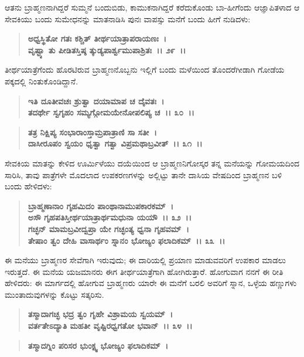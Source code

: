 ಆತನು ಬ್ರಾಹ್ಮಣನಾಗಿದ್ದರೆ ಸುಮ್ಮನೆ ಬಂದುಬಿಡು, ಕಾಮುಕನಾಗಿದ್ದರೆ ಕರೆದುಕೊಂಡು ಬಾ-ಹೀಗೆಂದು ಆಜ್ಞಾಪಿತಳಾದ ಆ ಸೇವಕಿಯು ಬಂದು ಸುಮೇಧನನ್ನು ಮಾತನಾಡಿಸಿ ಪುನಃ ವಾಪಸ್ಸು ಮನೆಗೆ ಬಂದು ಹೀಗೆ ನುಡಿದಳು:

\begin{verse}
\textbf{ಅಧ್ವಸ್ಥಿತೋ ಗತಃ ಕಶ್ಚಿತ್ ತೀರ್ಥಯಾತ್ರಾಪರಾಯಣಃ~।}\\\textbf{ವೃಷ್ಟ್ಯಾ ತು ಪೀಡಿತಸ್ತಿಷ್ಠ ತ್ಕುಡ್ಯಪಾರ್ಶ್ವಮುಪಾಶ್ರಿತಃ~।। ೨೯~।।}
\end{verse}

ತೀರ್ಥಯಾತ್ರೆಗೆಂದು ಹೊರಟಿರುವ ಬ್ರಾಹ್ಮಣನೊಬ್ಬನು ಇಲ್ಲಿಗೆ ಬಂದು ಮಳೆಯಿಂದ ತೊಂದರೆಗೀಡಾಗಿ ಗೋಡೆಯ ಪಕ್ಕದಲ್ಲಿ ನಿಂತುಕೊಂಡಿದ್ದಾನೆ.

\begin{verse}
\textbf{ಇತಿ ದೂತೀವಚಃ ಶ್ರುತ್ವಾ ದಯಾಮಾಪ ಚ ದೈವತಃ~।}\\\textbf{ತದರ್ಥೇ ಸ್ವಗೃಹಂ ಸಮ್ಯಗ್ಗೋಮಯೇನೋಪಲಿಪ್ಯ ಚ~।। ೩೦~।। }
\end{verse}

\begin{verse}
\textbf{ತತ್ರ ನಿಕ್ಷಿಪ್ಯ ಸಂಭಾರಾಂಸ್ತಾಮ್ರಪಾತ್ರಾಣಿ ಸಾ ಸತೀ~।}\\\textbf{ದಾಸೀರೂಪಂ ಸ್ವಯಂ ಧೃತ್ವಾ ಗತ್ವಾ ವಿಪ್ರಮಥಾಬ್ರವೀತ್~।। ೩೧~।।}
\end{verse}

ಸೇವಕಿಯ ಮಾತನ್ನು ಕೇಳಿದ ಊರ್ಮಿಳೆಯು ದಯೆಯಿಂದ ಆ ಬ್ರಾಹ್ಮಣನಿಗೋಸ್ಕರ ತನ್ನ ಮನೆಯನ್ನು ಗೋಮಯದಿಂದ ಸಾರಿಸಿ, ತಾವು ಪಾತ್ರೆಗಳೇ ಮೊದಲಾದ ಉಪಕರಣಗಳನ್ನು ಅಲ್ಲಿಟ್ಟು ತಾನೇ ದಾಸಿಯ ವೇಷದಿಂದ ಬ್ರಾಹ್ಮಣನ ಬಳಿ ಬಂದು ಹೇಳಿದಳು:

\begin{verse}
\textbf{ಬ್ರಾಹ್ಮಣಾನಾಂ ಗೃಹಮಿದಂ ಪಾಂಥಾನಾಮುಪಕಾರಕಮ್~।}\\\textbf{ಅಸೌ ಗೃಹಪತಿಸ್ತೀರ್ಥಯಾತ್ರಾರ್ಥಮಧುನಾ ಯಯೌ~।। ೩೨~।। }\\\textbf{ಗಚ್ಛನ್ ಮಾಮಬ್ರವೀದ್ವಪ್ರಾ ಯೇ ಗಚ್ಛಂತ್ಯ ಧ್ವನಾ ಗೃಹವಮ್~।} \\\textbf{ತೇಷಾಂ ತ್ವಂ ದೇಹಿ ವಾಸಾರ್ಥಂ ಸ್ನಾನಂ ಭೋಜ್ಯಂ ಫಲಾದಿಕಮ್~।। ೩೩~।।}
\end{verse}

ಈ ಮನೆಯು ಬ್ರಾಹ್ಮಣರ ಸೇವೆಗಾಗಿ ಇರುವುದು; ಈ ದಾರಿಯಲ್ಲಿ ಪ್ರಯಾಣ ಮಾಡುವವರಿಗೆ ಉಪಕಾರ ಮಾಡಲು ಇರುತ್ತದೆ. ಈ ಮನೆಯ ಯಜಮಾನರು ಈಗ ತೀರ್ಥಯಾತ್ರೆಗಾಗಿ ಹೋಗಿರುತ್ತಾರೆ. ಹೋಗುವಾಗ ನನಗೆ ಈ ರೀತಿ ಹೇಳಿದರು: ಈ ಮಾರ್ಗದಲ್ಲಿ ಹೋಗುವ ಬ್ರಾಹ್ಮಣರು ಯಾರೇ ಈ ಮನೆಗೆ ಬರಲಿ ಅವರಿಗೆ ಸ್ನಾನ, ಒಳ್ಳೆಯ ಹಣ್ಣುಗಳು ಮುಂತಾದುವುಗಳನ್ನು ಕೊಟ್ಟು ಸತ್ಕರಿಸು.

\begin{verse}
\textbf{ತಸ್ಮಾದಾಗಚ್ಛ ಭದ್ರ ತ್ವಂ ಗೃಹೇ ವಿಶ್ರಾಮಯ ಸ್ವಯಮ್~।}\\\textbf{ವರ್ತತೇಽದ್ಯಾತಿ ಮಹತೀ ವೃಷ್ಟಿರಧ್ವಗತೋ ಭವಾನ್~।। ೩೪~।। }
\end{verse}

\begin{verse}
\textbf{ತಸ್ಮಾದಗ್ನಿಂ ಪರಿಸರ ಭುಂಕ್ಷ್ವ ಭೋಜ್ಯಂ ಫಲಾದಿಕಮ್~।}
\end{verse}

